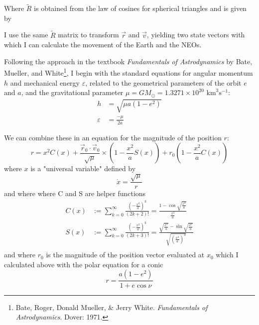 \documentclass[12pt]{article}
\begin{document}
Where $\tilde{R}$ is obtained from the law of cosines for spherical triangles and is given by


I use the same $\tilde{R}$ matrix to transform $\vec{r}$ and $\vec{v}$, yielding two state vectors with which I can calculate the movement of the Earth and the NEOs. 

Following the approach in the textbook \emph{Fundamentals of Astrodynamics} by Bate, Mueller, and White\footnote{Bate, Roger, Donald Mueller, \& Jerry White. \emph{Fundamentals of Astrodynamics}. Dover: 1971.
}, I begin with the standard equations for angular momentum $h$ and mechanical energy $\varepsilon$, related to the geometrical parameters of the orbit $e$ and $a$, and the gravitational parameter $\mu = GM_\odot = 1.3271\times 10^{20} \text{ km}^3 \text{s}^{-1}$: 
\begin{align*}
    h &= \sqrt{\mu a(1-e^2)}\\
    \varepsilon &= \frac{-\mu}{2a}
\end{align*}

We can combine these in an equation for the magnitude of the position $r$:
$$r = x^2 C(x) + \frac{\vec{r}_0 \cdot \vec{v}_0}{\sqrt{\mu}} \times (1 - \frac{x^2}{a} S(x)) + r_0 (1 - \frac{x^2}{a} C(x))$$
where $x$ is a "universal variable" defined by 
$$\dot{x} = \frac{\sqrt{\mu}}{r}$$
and where 
where C and S are helper functions
\begin{align*}
    C(x) &:=  \sum_{k=0}^{\infty} \frac{(-\frac{x^2}{a})^k}{(2k +2)!} = \frac{1 - \cos \sqrt{\frac{x^2}{a}}}{\frac{x^2}{a}}\\
    S(x) &:= \sum_{k=0}^{\infty} \frac{(-\frac{x^2}{a})^k}{(2k +3)!} = \frac{\sqrt{\frac{x^2}{a}} - \sin \sqrt{\frac{x^2}{a}}}{\sqrt{(\frac{x^2}{a})^3}}\\
\end{align*}
and where $r_0$ is the magnitude of the position vector evaluated at $x_0$ which I calculated above with the polar equation for a conic 
$$r = \frac{a(1-e^2)}{1 + e\cos \nu}$$
\end{document}
